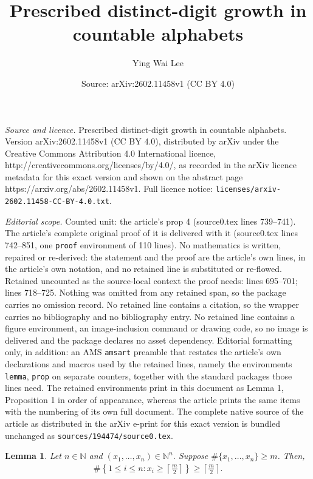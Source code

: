 \documentclass[10pt,a4paper]{amsart}
\title{Prescribed distinct-digit growth in countable alphabets}
\author{Ying Wai Lee}
\date{Source: arXiv:2602.11458v1 (CC BY 4.0)}
\newtheorem{lemma}{Lemma}
\begin{document}
\maketitle

\noindent\emph{Source and licence.} Prescribed distinct-digit growth in countable alphabets. Version arXiv:2602.11458v1 (CC BY 4.0), distributed by arXiv under the Creative Commons Attribution 4.0 International licence, http://creativecommons.org/licenses/by/4.0/, as recorded in the arXiv licence metadata for this exact version and shown on the abstract page https://arxiv.org/abs/2602.11458v1. Full licence notice: \texttt{licenses/arxiv-2602.11458-CC-BY-4.0.txt}.\par\smallskip

\noindent\textit{Editorial scope.} Counted unit: the article's prop 4 (source0.tex lines 739--741). The article's complete original proof of it is delivered with it (source0.tex lines 742--851, one \texttt{proof} environment of 110 lines). No mathematics is written, repaired or re-derived: the statement and the proof are the article's own lines, in the article's own notation, and no retained line is substituted or re-flowed.  Retained uncounted as the source-local context the proof needs: lines 695--701; lines 718--725.  Nothing was omitted from any retained span, so the package carries no omission record.  No retained line contains a citation, so the wrapper carries no bibliography and no bibliography entry.  No retained line contains a figure environment, an image-inclusion command or drawing code, so no image is delivered and the package declares no asset dependency.  Editorial formatting only, in addition: an AMS \texttt{amsart} preamble that restates the article's own declarations and macros used by the retained lines, namely the environments \texttt{lemma}, \texttt{prop} on separate counters, together with the standard packages those lines need.  The retained environments print in this document as Lemma 1, Proposition 1 in order of appearance, whereas the article prints the same items with the numbering of its own full document.  The complete native source of the article as distributed in the arXiv e-print for this exact version is bundled unchanged as \texttt{sources/194474/source0.tex}.
\begin{lemma}\label{lem:distinctforceslarge}
Let $n\in\mathbb{N}$ and $(x_1,\ldots,x_n)\in\mathbb{N}^n$. Suppose $\#\{x_1,\ldots,x_n\}\geq m$. Then,
\begin{align*}
    \#\left\{1\leq i\leq n: x_i\geq \left\lceil\frac{m}{2}\right\rceil \right\}
    \geq \left\lceil\frac{m}{2}\right\rceil.
\end{align*}
\end{lemma}
\end{document}
